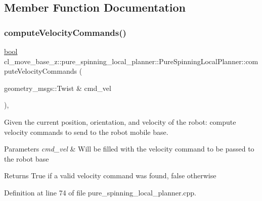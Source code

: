 \subsection{Member Function Documentation}
\mbox{\label{classcl__move__base__z_1_1pure__spinning__local__planner_1_1PureSpinningLocalPlanner_af7dfee89a0a6c54569b5fd262ccbd4f0}} 
\subsubsection{\texorpdfstring{compute\+Velocity\+Commands()}{computeVelocityCommands()}}
{\footnotesize\ttfamily \hyperlink{classbool}{bool} cl\+\_\+move\+\_\+base\+\_\+z\+::pure\+\_\+spinning\+\_\+local\+\_\+planner\+::\+Pure\+Spinning\+Local\+Planner\+::compute\+Velocity\+Commands (\begin{DoxyParamCaption}\item[{geometry\+\_\+msgs\+::\+Twist \&}]{cmd\+\_\+vel }\end{DoxyParamCaption})\hspace{0.3cm}{\ttfamily [override]}, {\ttfamily [virtual]}}



Given the current position, orientation, and velocity of the robot\+: compute velocity commands to send to the robot mobile base. 


\begin{DoxyParams}{Parameters}
{\em cmd\+\_\+vel} & Will be filled with the velocity command to be passed to the robot base \\
\hline
\end{DoxyParams}
\begin{DoxyReturn}{Returns}
True if a valid velocity command was found, false otherwise 
\end{DoxyReturn}


Definition at line 74 of file pure\+\_\+spinning\+\_\+local\+\_\+planner.\+cpp.



